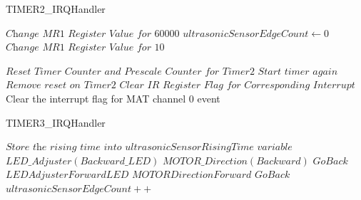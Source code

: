 \documentclass[12pt]{article}
\begin{document}
\begin{algorithm}
\caption{TIMER2\_IRQHandler}\label{euclid}
\begin{algorithmic}[1]
\Comment{}

        \State $\textit{Change MR1 Register Value for 60000}$
        \State $ultrasonicSensorEdgeCount \gets 0$
    \Else \State $\textit{Change MR1 Register Value for 10}$
    \EndIf
    
     \State $\textit{Reset Timer Counter and Prescale Counter for Timer2}$
     \State $\textit{Start timer again}$
     \State $\textit{Remove reset on Timer2}$
      \State $\textit{Clear IR Register Flag for Corresponding Interrupt}$
     \State Clear the interrupt flag for MAT channel 0 event
\EndIf
\EndProcedure
\end{algorithmic}
\end{algorithm}

\begin{algorithm}
\caption{TIMER3\_IRQHandler}\label{euclid}
\begin{algorithmic}[1]
\Comment{}

     \State $\textit{Store the rising time into ultrasonicSensorRisingTime variable}$
\EndIf
{}
        \State $LED\_Adjuster(Backward\_LED)$
        \State $MOTOR\_Direction(Backward)$
        \State $Go Back$
    \EndIf
        \State $LEDAdjuster Forward LED$
        \State $MOTORDirection Forward$
        \State $Go Back$
    \EndIf
\EndIf
\State $ultrasonicSensorEdgeCount++$

\EndProcedure
\end{algorithmic}
\end{algorithm}
\end{document}
